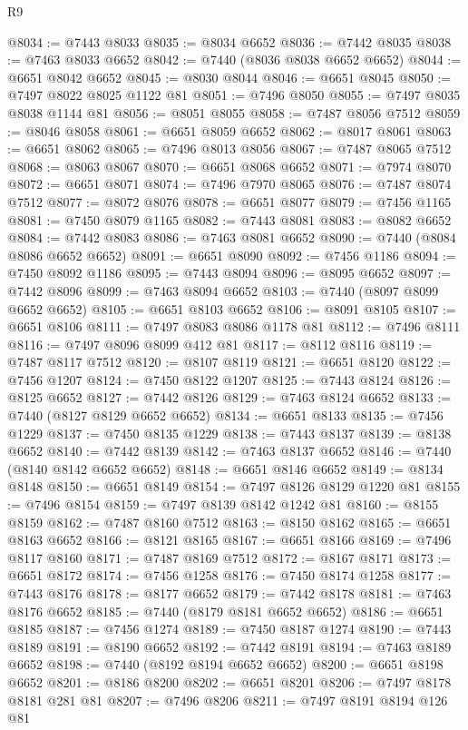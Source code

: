 \begin{lexlean}{R9}
\begin{coremodule}
{{{{{{{{{{{{{{{{{{{{{{{{{{{{{{{{{{{{{{{{{{{{{{{{{{{{{{{{{{{{{{{{{{{{{{{{{{{{{{{{{{{{@8034 := @7443 @8033
@8035 := @8034 @6652
@8036 := @7442 @8035
@8038 := @7463 @8033 @6652
@8042 := @7440 (@8036 @8038 @6652 @6652)
@8044 := @6651 @8042 @6652
@8045 := @8030 @8044
@8046 := @6651 @8045
@8050 := @7497 @8022 @8025 @1122 @81
@8051 := @7496 @8050
@8055 := @7497 @8035 @8038 @1144 @81
@8056 := @8051 @8055
@8058 := @7487 @8056 @7512
@8059 := @8046 @8058
@8061 := @6651 @8059 @6652
@8062 := @8017 @8061
@8063 := @6651 @8062
@8065 := @7496 @8013 @8056
@8067 := @7487 @8065 @7512
@8068 := @8063 @8067
@8070 := @6651 @8068 @6652
@8071 := @7974 @8070
@8072 := @6651 @8071
@8074 := @7496 @7970 @8065
@8076 := @7487 @8074 @7512
@8077 := @8072 @8076
@8078 := @6651 @8077
@8079 := @7456 @1165
@8081 := @7450 @8079 @1165
@8082 := @7443 @8081
@8083 := @8082 @6652
@8084 := @7442 @8083
@8086 := @7463 @8081 @6652
@8090 := @7440 (@8084 @8086 @6652 @6652)
@8091 := @6651 @8090
@8092 := @7456 @1186
@8094 := @7450 @8092 @1186
@8095 := @7443 @8094
@8096 := @8095 @6652
@8097 := @7442 @8096
@8099 := @7463 @8094 @6652
@8103 := @7440 (@8097 @8099 @6652 @6652)
@8105 := @6651 @8103 @6652
@8106 := @8091 @8105
@8107 := @6651 @8106
@8111 := @7497 @8083 @8086 @1178 @81
@8112 := @7496 @8111
@8116 := @7497 @8096 @8099 @412 @81
@8117 := @8112 @8116
@8119 := @7487 @8117 @7512
@8120 := @8107 @8119
@8121 := @6651 @8120
@8122 := @7456 @1207
@8124 := @7450 @8122 @1207
@8125 := @7443 @8124
@8126 := @8125 @6652
@8127 := @7442 @8126
@8129 := @7463 @8124 @6652
@8133 := @7440 (@8127 @8129 @6652 @6652)
@8134 := @6651 @8133
@8135 := @7456 @1229
@8137 := @7450 @8135 @1229
@8138 := @7443 @8137
@8139 := @8138 @6652
@8140 := @7442 @8139
@8142 := @7463 @8137 @6652
@8146 := @7440 (@8140 @8142 @6652 @6652)
@8148 := @6651 @8146 @6652
@8149 := @8134 @8148
@8150 := @6651 @8149
@8154 := @7497 @8126 @8129 @1220 @81
@8155 := @7496 @8154
@8159 := @7497 @8139 @8142 @1242 @81
@8160 := @8155 @8159
@8162 := @7487 @8160 @7512
@8163 := @8150 @8162
@8165 := @6651 @8163 @6652
@8166 := @8121 @8165
@8167 := @6651 @8166
@8169 := @7496 @8117 @8160
@8171 := @7487 @8169 @7512
@8172 := @8167 @8171
@8173 := @6651 @8172
@8174 := @7456 @1258
@8176 := @7450 @8174 @1258
@8177 := @7443 @8176
@8178 := @8177 @6652
@8179 := @7442 @8178
@8181 := @7463 @8176 @6652
@8185 := @7440 (@8179 @8181 @6652 @6652)
@8186 := @6651 @8185
@8187 := @7456 @1274
@8189 := @7450 @8187 @1274
@8190 := @7443 @8189
@8191 := @8190 @6652
@8192 := @7442 @8191
@8194 := @7463 @8189 @6652
@8198 := @7440 (@8192 @8194 @6652 @6652)
@8200 := @6651 @8198 @6652
@8201 := @8186 @8200
@8202 := @6651 @8201
@8206 := @7497 @8178 @8181 @281 @81
@8207 := @7496 @8206
@8211 := @7497 @8191 @8194 @126 @81
}}}}}}}}}}}}}}}}}}}}}}}}}}}}}}}}}}}}}}}}}}}}}}}}}}}}}}}}}}}}}}}}}}}}}}}}}}}}}}}}}}}}
\end{coremodule}
\end{lexlean}
